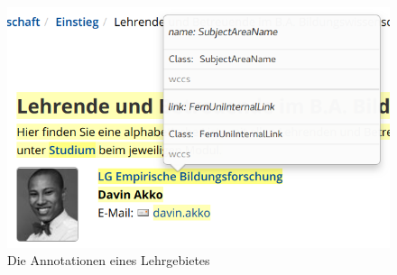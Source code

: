     \begin{figure}[htb]
        \centering
        \includegraphics[scale=\screenshotScaleFactor]{../resources/findings/case-study-1/babw/annotations/double-lg-annotation.png}
        \caption{Die Annotationen eines Lehrgebietes}
        \label{image:findingTeachersSubjectAreaAnnotations}
    \end{figure}
